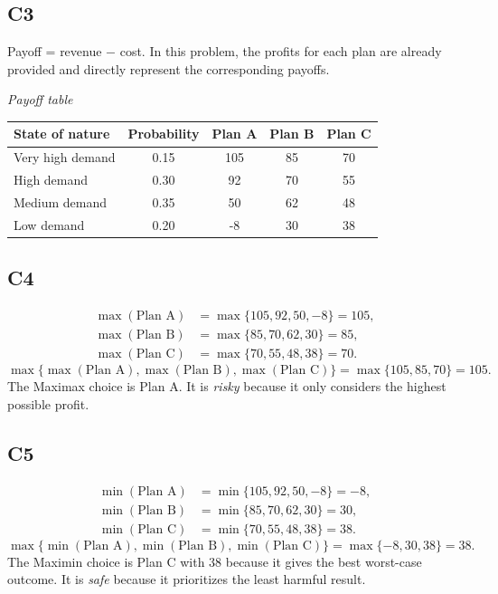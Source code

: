 \begin{ExamProblems}
		\subsection*{C3}
		Payoff = revenue $-$ cost. In this problem, the profits for each plan are already provided and directly represent the corresponding payoffs.
		\begin{center}
			\textit{Payoff table} \\
			\begin{tabular}{l c c c c}
				\toprule
				State of nature & Probability & Plan A & Plan B & Plan C \\
				\midrule
				Very high demand & 0.15 & 105 & 85 & 70 \\
				High demand & 0.30 & 92 & 70 & 55 \\
				Medium demand & 0.35 & 50 & 62 & 48 \\
				Low demand & 0.20 & -8 & 30 & 38 \\
				\bottomrule
			\end{tabular}
		\end{center}

		\subsection*{C4}
		\[
		\begin{aligned}
		\max(\text{Plan A}) &= \max\{105,92,50,-8\} = 105,\\
		\max(\text{Plan B}) &= \max\{85,70,62,30\} = 85,\\
		\max(\text{Plan C}) &= \max\{70,55,48,38\} = 70.
		\end{aligned}
		\]
		\[
		\max\{\max(\text{Plan A}), \max(\text{Plan B}), \max(\text{Plan C})\}
		= \max\{105, 85, 70\}
		= 105.
		\]
		The Maximax choice is Plan A. It is \emph{risky} because it only considers the highest possible profit.

		\subsection*{C5}
		\[
		\begin{aligned}
		\min(\text{Plan A}) &= \min\{105,92,50,-8\} = -8,\\
		\min(\text{Plan B}) &= \min\{85,70,62,30\} = 30,\\
		\min(\text{Plan C}) &= \min\{70,55,48,38\} = 38.
		\end{aligned}
		\]
		\[
		\max\{\min(\text{Plan A}), \min(\text{Plan B}), \min(\text{Plan C})\}
		= \max\{-8, 30, 38\}
		= 38.
		\]
		The Maximin choice is Plan C with 38 because it gives the best worst-case outcome. It is \emph{safe} because it prioritizes the least harmful result.


\end{ExamProblems}
